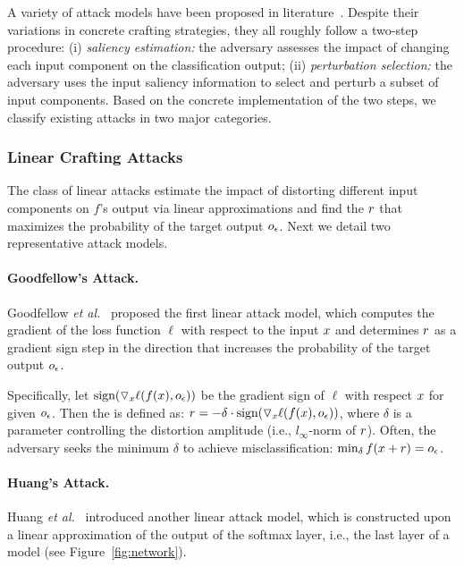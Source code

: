 A variety of attack models have been proposed in literature~\cite{Goodfellow:2014:arxiv,Huang:2015:arxiv,Papernot:2016:eurosp,Carlini:2016:arXiv}. Despite their variations in concrete crafting strategies, they all roughly follow a two-step procedure: (i) {\em saliency estimation:} the adversary assesses the impact of changing each input component on the classification output; (ii) {\em perturbation selection:} the adversary uses the input saliency information to select and perturb a subset of input components. Based on the concrete implementation of the two steps,  we classify existing attacks in two major categories.

\subsubsection{Linear Crafting Attacks}
The class of linear attacks estimate the impact of distorting different input components on $f$'s output via linear approximations and find the \pv $r$ that maximizes the probability of the target output $o_\epsilon$. Next we detail two representative attack models.

\paragraph{Goodfellow's Attack.\;} Goodfellow {\em et al.}~\cite{Goodfellow:2014:arxiv} proposed the first linear attack model, which computes the gradient of the loss function $\ell$ with respect to the input $x$ and determines $r$ as a gradient sign step in the direction that increases the probability of the target output $o_\epsilon$.


Specifically, let $\textrm{sign} (\triangledown_{x} \ell (f(x), o_\epsilon) )$ be the gradient sign of $\ell$ with respect $x$ for given $o_\epsilon$. Then the \pv is defined as:
$r = - \delta  \cdot \textrm{sign} (\triangledown_{x} \ell (f(x), o_\epsilon) )$,
where $\delta$ is a parameter controlling the distortion amplitude (i.e., $l_\infty$-norm of $r$). Often, the adversary seeks the minimum $\delta$ to achieve misclassification:
$\min_\delta f( x + r) = o_\epsilon$.



\paragraph*{Huang's Attack.\;} Huang {\em et al.}~\cite{Huang:2015:arxiv} introduced another linear attack model, which is constructed upon a linear approximation of the output of the softmax layer, i.e., the last layer of a \dnn model (see  Figure~\ref{fig:network}).

